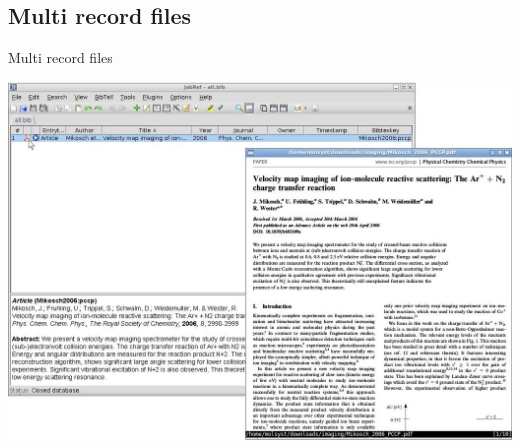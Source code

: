 \documentclass[xcolor={table,dvipsnames}]{beamer}
\newcommand{\bashcmd}[2][-0.6\baselineskip]{%
  \vspace{#1}%
}
\begin{document}
\subsection{Multi record files}
\begin{frame}{Multi record files}
  \bashcmd[0pt]{cmdline/all/d2-1-in.txt}
  \begin{center}
    \includegraphics[height=.7\textheight,trim=0 120 0 0,clip]{jabref.jpg}
  \end{center}
\end{frame}
\end{document}

